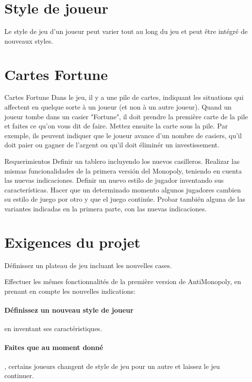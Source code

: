 \documentclass[12pt]{article}
\begin{document}
\begin{itemize}
\begin{itemize}
\end{itemize}






\section{Style de joueur}

    Le style de jeu d'un joueur peut varier tout au long du jeu et peut être intégré
de nouveaux styles.

\section{Cartes Fortune}

Cartes Fortune
Dans le jeu, il y a une pile de cartes, indiquant les situations qui affectent
en quelque sorte à un joueur (et non à un autre joueur).
 Quand un joueur tombe dans un casier "Fortune", il doit prendre la première carte de la pile et faites ce
  qu'on vous dit de faire. 
  Mettez ensuite la carte sous la pile. 
  Par exemple, ils peuvent indiquer que le joueur avance d'un nombre de casiers, 
  qu'il doit paier ou gagner de l'argent ou qu'il doit éliminér un investissement.


Requerimientos
    Definir un tablero incluyendo los nuevos casilleros.
    Realizar las mismas funcionalidades de la primera versión del Monopoly, teniendo
en cuenta las nuevas indicaciones.
    Definir un nuevo estilo de jugador inventando sus características. Hacer que un
determinado momento algunos jugadores cambien su estilo de juego por otro y
que el juego continúe.
    Probar también alguna de las variantes indicadas en la primera parte, con las
nuevas indicaciones.

\section{Exigences du projet}
     Définissez un plateau de jeu incluant les nouvelles cases.

     Effectuer les mêmes fonctionnalités de la première version de AntiMonopoly, en prenant
    en compte les nouvelles indications:
    \paragraph{ Définissez un nouveau style de joueur} en inventant ses caractéristiques. 
    \paragraph{ Faites que au moment donné}, certains joueurs changent de style de jeu pour un autre et
laissez le jeu continuer.

\end{itemize}
\end{document}
